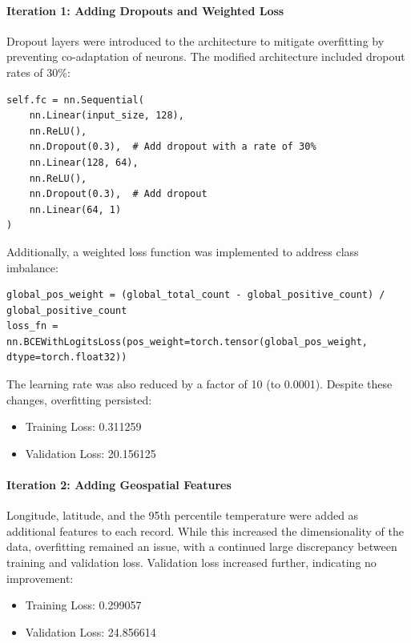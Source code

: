 \documentclass[8pt,a4paper]{article}
\begin{document}
\paragraph{Iteration 1: Adding Dropouts and Weighted Loss}
Dropout layers were introduced to the architecture to mitigate overfitting by preventing co-adaptation of neurons. The modified architecture included dropout rates of 30\%:
\begin{lstlisting}
self.fc = nn.Sequential(
    nn.Linear(input_size, 128),
    nn.ReLU(),
    nn.Dropout(0.3),  # Add dropout with a rate of 30%
    nn.Linear(128, 64),
    nn.ReLU(),
    nn.Dropout(0.3),  # Add dropout
    nn.Linear(64, 1)
)
\end{lstlisting}
Additionally, a weighted loss function was implemented to address class imbalance:
\begin{lstlisting}
global_pos_weight = (global_total_count - global_positive_count) / global_positive_count
loss_fn = nn.BCEWithLogitsLoss(pos_weight=torch.tensor(global_pos_weight, dtype=torch.float32))
\end{lstlisting}
The learning rate was also reduced by a factor of 10 (to 0.0001). Despite these changes, overfitting persisted:
\begin{itemize}
    \item Training Loss: 0.311259
    \item Validation Loss: 20.156125
\end{itemize}
\paragraph{Iteration 2: Adding Geospatial Features}
Longitude, latitude, and the 95th percentile temperature were added as additional features to each record. While this increased the dimensionality of the data, overfitting remained an issue, with a continued large discrepancy between training and validation loss. Validation loss increased further, indicating no improvement:
\begin{itemize}
    \item Training Loss: 0.299057
    \item Validation Loss: 24.856614
\end{itemize}
\end{document}
